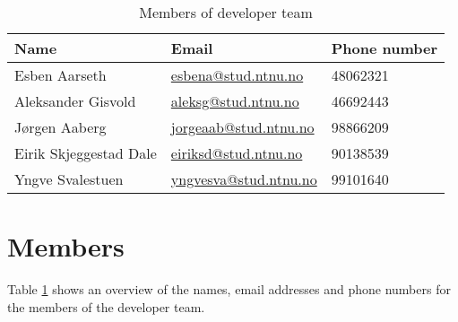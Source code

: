 \begin{table}[t]
	\begin{center}
		\begin{tabular}{|p{4cm}|p{7cm}|p{4cm}|}   
			\hline      
			\bf{Name} & \bf{Email} & \bf{Phone number} \\ 
			\hline
			Esben Aarseth & \href{mailto:esbena@stud.ntnu.no}{esbena@stud.ntnu.no} & 48062321   \\     
			\hline
			Aleksander Gisvold & \href{mailto:aleksg@stud.ntnu.no}{aleksg@stud.ntnu.no}
			& 46692443 \\
			\hline
			Jørgen Aaberg & \href{mailto:jorgeaab@stud.ntnu.no}{jorgeaab@stud.ntnu.no} &
			98866209 \\
			\hline
			Eirik Skjeggestad Dale & \href{mailto:eiriksd@stud.ntnu.no}{eiriksd@stud.ntnu.no}
			& 90138539\\
			\hline
			Yngve Svalestuen & \href{mailto:yngvesva@stud.ntnu.no}{yngvesva@stud.ntnu.no} & 99101640 \\
			\hline
		\end{tabular}
		\caption[Members of developer team]{Members of developer team}
		\label{tab:members}
	\end{center}
\end{table}

\section{Members}
Table \ref{tab:members} shows an overview of the names, email addresses and phone numbers
for the members of the developer team.

